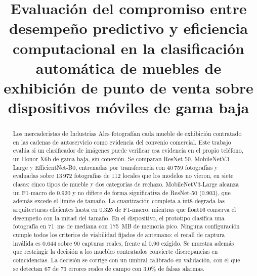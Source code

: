 \documentclass[conference]{IEEEtran}
\begin{document}
\title{Evaluación del compromiso entre desempeño predictivo y eficiencia computacional en la clasificación
automática de muebles de exhibición de punto de venta sobre dispositivos móviles de gama baja}

\author{
\and
{}
}

\maketitle

\begin{abstract}
Los mercaderistas de Industrias Ales fotografían cada mueble de exhibición contratado en las cadenas de autoservicio
como evidencia del convenio comercial. Este trabajo evalúa si un clasificador de imágenes puede verificar esa
evidencia en el propio teléfono, un Honor X6b de gama baja, sin conexión. Se comparan ResNet-50, MobileNetV3-Large y
EfficientNet-B0, entrenadas por transferencia con 40\,759 fotografías y evaluadas sobre 13\,972 fotografías de 112
locales que los modelos no vieron, en siete clases: cinco tipos de mueble y dos categorías de rechazo.
MobileNetV3-Large alcanza un F1-macro de 0.920 y no difiere de forma significativa de ResNet-50 (0.903), que además
excede el límite de tamaño. La cuantización completa a int8 degrada las arquitecturas eficientes hasta en 0.325 de
F1-macro, mientras que float16 conserva el desempeño con la mitad del tamaño. En el dispositivo, el prototipo
clasifica una fotografía en 71~ms de mediana con 175~MB de memoria pico. Ninguna configuración cumple todos los
criterios de viabilidad fijados de antemano: el recall de captura inválida es 0.644 sobre 90 capturas reales, frente
al 0.90 exigido. Se muestra además que restringir la decisión a los muebles contratados convierte discrepancias en
coincidencias. La decisión se corrige con un umbral calibrado en validación, con el que se detectan 67 de 73
errores reales de campo con 3.0\% de falsas alarmas.
\end{abstract}
\end{document}
